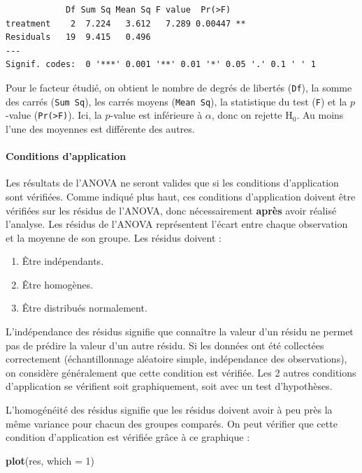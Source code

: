 \documentclass[
  a4paper,
]{article}
\newenvironment{Shaded}{\begin{snugshade}}{\end{snugshade}}
\newcommand{\DataTypeTok}[1]{\textcolor[rgb]{0.00,0.34,0.68}{#1}}
\newcommand{\DecValTok}[1]{\textcolor[rgb]{0.69,0.50,0.00}{#1}}
\newcommand{\KeywordTok}[1]{\textcolor[rgb]{0.12,0.11,0.11}{\textbf{#1}}}
\newcommand{\NormalTok}[1]{\textcolor[rgb]{0.12,0.11,0.11}{#1}}
\providecommand{\tightlist}{%
  \setlength{\itemsep}{0pt}\setlength{\parskip}{0pt}}
\begin{document}
\begin{verbatim}
            Df Sum Sq Mean Sq F value  Pr(>F)   
treatment    2  7.224   3.612   7.289 0.00447 **
Residuals   19  9.415   0.496                   
---
Signif. codes:  0 '***' 0.001 '**' 0.01 '*' 0.05 '.' 0.1 ' ' 1
\end{verbatim}

Pour le facteur étudié, on obtient le nombre de degrés de libertés (\texttt{Df}), la somme des carrés (\texttt{Sum\ Sq}), les carrés moyens (\texttt{Mean\ Sq}), la statistique du test (\texttt{F}) et la \(p\)-value (\texttt{Pr(\textgreater{}F)}). Ici, la \(p\)-value est inférieure à \(\alpha\), donc on rejette H\(_0\). Au moins l'une des moyennes est différente des autres.

\hypertarget{CAANOVA}{%
\paragraph{Conditions d'application}\label{CAANOVA}}

Les résultats de l'ANOVA ne seront valides que si les conditions d'application sont vérifiées. Comme indiqué plus haut, ces conditions d'application doivent être vérifiées sur les résidus de l'ANOVA, donc nécessairement \textbf{après} avoir réalisé l'analyse. Les résidus de l'ANOVA représentent l'écart entre chaque observation et la moyenne de son groupe. Les résidus doivent :

\begin{enumerate}
\def\labelenumi{\arabic{enumi}.}
\tightlist
\item
  Être indépendants.
\item
  Être homogènes.
\item
  Être distribués normalement.
\end{enumerate}

L'indépendance des résidus signifie que connaître la valeur d'un résidu ne permet pas de prédire la valeur d'un autre résidu. Si les données ont été collectées correctement (échantillonnage aléatoire simple, indépendance des observations), on considère généralement que cette condition est vérifiée. Les 2 autres conditions d'application se vérifient soit graphiquement, soit avec un test d'hypothèses.

L'homogénéité des résidus signifie que les résidus doivent avoir à peu près la même variance pour chacun des groupes comparés. On peut vérifier que cette condition d'application est vérifiée grâce à ce graphique :

\begin{Shaded}
\begin{Highlighting}[]
\KeywordTok{plot}\NormalTok{(res, }\DataTypeTok{which =} \DecValTok{1}\NormalTok{)}
\end{Highlighting}
\end{Shaded}
\end{document}

